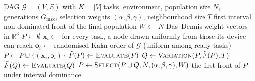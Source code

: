 
\begin{algorithm}[!htbp]
\caption{\ours{}: main loop}
\label{alg:main}
\begin{algorithmic}[1]
\Require DAG $\mathcal{G} = (V, E)$ with $K = |V|$ tasks, environment, population size $N$, generations $G_{\max}$,
  selection weights $(\alpha, \beta, \gamma)$, neighbourhood size $T$
\Ensure first interval non-dominated front of the final population
\State $W \gets$ $N$ Das--Dennis weight vectors in $\mathbb{R}^3$
\State $P \gets \emptyset$
  \State $\mathbf{x}_i \gets$ for every task, a node drawn uniformly from those its device can reach
  \State $\mathbf{o}_i \gets$ randomised Kahn order of $\mathcal{G}$ (uniform among ready tasks)
  \State $P \gets P \cup \{(\mathbf{x}_i, \mathbf{o}_i)\}$
\EndFor
\State $\tilde{F}(P) \gets \Call{Evaluate}{P}$ 
  \State $Q \gets \Call{Variation}{P, \tilde{F}(P), T}$ 
  \State $\tilde{F}(Q) \gets \Call{Evaluate}{Q}$
  \State $P \gets \Call{Select}{P \cup Q, N, (\alpha, \beta, \gamma), W}$ 
\EndFor
\State \Return the first front of $P$ under interval dominance
\end{algorithmic}
\end{algorithm}


